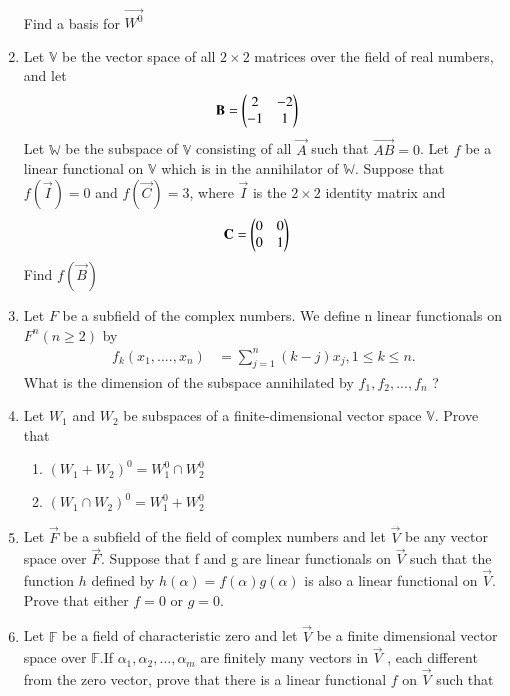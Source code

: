 \begin{enumerate}[label=\thesubsection.\arabic*.,ref=\thesubsection.\theenumi]
\begin{multline}
\begin{aligned}
    \end{aligned}
    \end{multline}
    Find a basis for $\vec{W^0}$
%
\\
\solution

\item Let $\mathbb{V}$ be the vector space of all $2 \times 2$ matrices over the field of real numbers, and let
\begin{align}
\mathbf{B} &= \begin{pmatrix}2&-2\\-1&1\end{pmatrix}
\end{align}
Let $\mathbb{W}$ be the subspace of $\mathbb{V}$ consisting of all $\vec{A}$ such that $\vec{AB} = 0$. Let $f$ be a linear functional on $\mathbb{V}$ which is in the annihilator of $\mathbb{W}$. Suppose that $f(\vec{I}) = 0$ and $f(\vec{C}) = 3$, where $\vec{I}$ is the $2 \times 2$ identity matrix and
\begin{align}
\mathbf{C} &= \begin{pmatrix}0&0\\0&1\end{pmatrix}
\end{align}
Find $f(\vec{B})$
%
\\
\solution

\item Let $F$ be a subfield of the complex numbers. We define n linear functionals on $F^n(n \ge 2)$ by
\begin{align}
    f_k(x_1,....,x_n) &= \sum_{j=1}^{n}(k-j)x_j, 
    1 \le k \le n.
\end{align}
What is the dimension of the subspace annihilated by $f_1,f_2,...,f_n$ ?
%
\\
\solution

\item Let $W_1$ and $W_2$ be subspaces of a finite-dimensional vector space $\mathbb V$. Prove that
\begin{enumerate}
    \item $(W_1 + W_2)^0 = W_1^0 \cap W_2^0$
    \item $(W_1 \cap W_2)^0 = W_1^0 + W_2^0$
\end{enumerate}
%
\solution

\item Let $\vec{F}$ be a subfield of the field of complex numbers and let $\vec{V}$ be any vector space over $\vec{F}$. Suppose that f and g are linear functionals on $\vec{V}$ such that the function $h$ defined by $h(\alpha) =f(\alpha) g(\alpha)$ is also a linear functional on $\vec{V}$. Prove that either $f=0$ or $g=0$.
%
\\
\solution

\item Let $\mathbb{F}$ be a field of characteristic zero and let $\vec{V}$ be a finite dimensional vector space over  $\mathbb{F}$.If $\alpha_1,\alpha_2,\hdots,\alpha_m$ are finitely many vectors in $\vec{V}$ , each different from the zero vector, prove that there is a linear functional $f$ on $\vec{V}$ such that

\end{enumerate}
